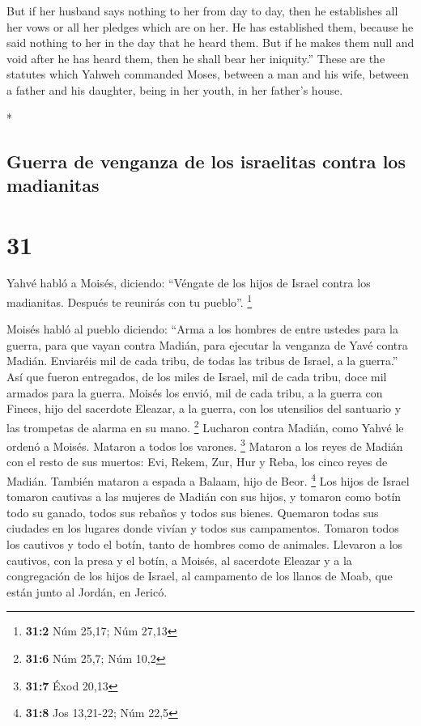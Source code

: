 \begin{paracol}{2}
\begin{otherlanguage}{english}
 But if her husband says nothing to her from day to day,
then he establishes all her vows or all her pledges which are on her. He
has established them, because he said nothing to her in the day that he
heard them.  But if he makes them null and void after he
has heard them, then he shall bear her iniquity.''  These
are the statutes which Yahweh commanded Moses, between a man and his
wife, between a father and his daughter, being in her youth, in her
father's house.

\end{otherlanguage}

\switchcolumn[0]*

\hypertarget{guerra-de-venganza-de-los-israelitas-contra-los-madianitas}{%
\subsection{Guerra de venganza de los israelitas contra los
madianitas}\label{guerra-de-venganza-de-los-israelitas-contra-los-madianitas}}

\hypertarget{section-60}{%
\section{31}\label{section-60}}

 Yahvé habló a Moisés, diciendo:  ``Véngate
de los hijos de Israel contra los madianitas. Después te reunirás con tu
pueblo''. \footnote{\textbf{31:2} Núm 25,17; Núm 27,13}

 Moisés habló al pueblo diciendo: ``Arma a los hombres de
entre ustedes para la guerra, para que vayan contra Madián, para
ejecutar la venganza de Yavé contra Madián.  Enviaréis mil
de cada tribu, de todas las tribus de Israel, a la guerra.''
 Así que fueron entregados, de los miles de Israel, mil de
cada tribu, doce mil armados para la guerra.  Moisés los
envió, mil de cada tribu, a la guerra con Finees, hijo del sacerdote
Eleazar, a la guerra, con los utensilios del santuario y las trompetas
de alarma en su mano. \footnote{\textbf{31:6} Núm 25,7; Núm 10,2}
 Lucharon contra Madián, como Yahvé le ordenó a Moisés.
Mataron a todos los varones. \footnote{\textbf{31:7} Éxod 20,13}
 Mataron a los reyes de Madián con el resto de sus
muertos: Evi, Rekem, Zur, Hur y Reba, los cinco reyes de Madián. También
mataron a espada a Balaam, hijo de Beor. \footnote{\textbf{31:8} Jos
  13,21-22; Núm 22,5}  Los hijos de Israel tomaron
cautivas a las mujeres de Madián con sus hijos, y tomaron como botín
todo su ganado, todos sus rebaños y todos sus bienes. 
Quemaron todas sus ciudades en los lugares donde vivían y todos sus
campamentos.  Tomaron todos los cautivos y todo el botín,
tanto de hombres como de animales.  Llevaron a los
cautivos, con la presa y el botín, a Moisés, al sacerdote Eleazar y a la
congregación de los hijos de Israel, al campamento de los llanos de
Moab, que están junto al Jordán, en Jericó.


\end{paracol}

